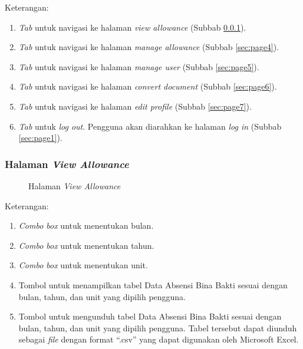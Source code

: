 Keterangan:
\begin{enumerate}
	\item \textit{Tab} untuk navigasi ke halaman \textit{view allowance} (Subbab \ref{sec:page3}).
	\item \textit{Tab} untuk navigasi ke halaman \textit{manage allowance} (Subbab \ref{sec:page4}).
	\item \textit{Tab} untuk navigasi ke halaman \textit{manage user} (Subbab \ref{sec:page5}).
	\item \textit{Tab} untuk navigasi ke halaman \textit{convert document} (Subbab \ref{sec:page6}).
	\item \textit{Tab} untuk navigasi ke halaman \textit{edit profile} (Subbab \ref{sec:page7}).
	\item \textit{Tab} untuk \textit{log out}.	Pengguna akan diarahkan ke halaman \textit{log in} (Subbab \ref{sec:page1}).
\end{enumerate}


\subsubsection{Halaman \textit{View Allowance}}
\label{sec:page3}

\begin{figure}[H]
	\centering
	\caption{Halaman \textit{View Allowance}}
	\label{fig:page3}
\end{figure}	

Keterangan:
\begin{enumerate}
	\item \textit{Combo box} untuk menentukan bulan.
	\item \textit{Combo box} untuk menentukan tahun.
	\item \textit{Combo box} untuk menentukan unit.
	\item Tombol untuk menampilkan tabel Data Absensi Bina Bakti sesuai dengan bulan, tahun, dan unit yang dipilih pengguna.
	\item Tombol untuk mengunduh tabel Data Absensi Bina Bakti sesuai dengan bulan, tahun, dan unit yang dipilih pengguna. Tabel tersebut dapat diunduh sebagai \textit{file} dengan format ``.csv'' yang dapat digunakan oleh Microsoft Excel. 
\end{enumerate}

